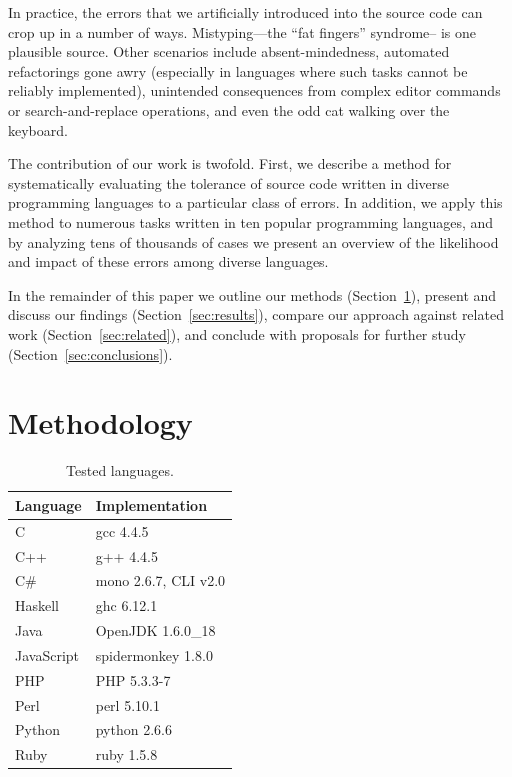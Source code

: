 \documentclass[10pt]{sigplanconf}
\begin{document}
In practice,
the errors that we artificially introduced into the source code can
crop up in a number of ways.
Mistyping---the ``fat fingers'' syndrome-- is one plausible source.
Other scenarios include
absent-mindedness,
automated refactorings gone awry
(especially in languages where such tasks cannot be reliably implemented),
unintended consequences from complex editor commands or
search-and-replace operations,
and even the odd cat walking over the keyboard.

The contribution of our work is twofold.
First, we describe a method for systematically evaluating the tolerance
of source code written in diverse programming languages to a particular
class of errors.
In addition, we apply this method to numerous tasks written in ten popular
programming languages,
and by analyzing tens of thousands of cases we present an overview of
the likelihood and impact of these errors among diverse languages.

In the remainder of this paper we
outline our methods (Section~\ref{sec:method}),
present and discuss our findings (Section~\ref{sec:results}),
compare our approach against related work (Section~\ref{sec:related}),
and conclude with proposals for further study (Section~\ref{sec:conclusions}).

\section{Methodology} %
\label{sec:method}

\begin{table}
\begin{center}
\begin{tabular}{ l l}
Language & Implementation \\
\hline
C 			& gcc 4.4.5 \\
C++ 		& g++ 4.4.5 \\
C\# 		& mono 2.6.7, CLI v2.0 \\
Haskell 	& ghc 6.12.1 \\
Java 		& OpenJDK 1.6.0\_18 \\
JavaScript 	& spidermonkey 1.8.0 \\
PHP 		& PHP 5.3.3-7 \\
Perl 		& perl 5.10.1 \\
Python 		& python 2.6.6 \\
Ruby 		& ruby 1.5.8 \\
\end{tabular}
\end{center}
\caption{Tested languages.}
\label{tab:langs}
\end{table}
\end{document}
